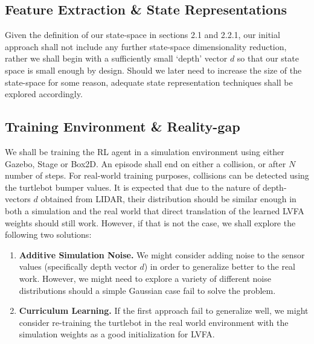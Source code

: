 \documentclass{article}
\begin{document}

\subsection{Feature Extraction \& State Representations}
Given the definition of our state-space in sections 2.1 and 2.2.1, our initial approach shall not include any further state-space dimensionality reduction, rather we shall begin with a sufficiently small `depth' vector $d$ so that our state space is small enough by design. Should we later need to increase the size of the state-space for some reason, adequate state representation techniques shall be explored accordingly.

\subsection{Training Environment \& Reality-gap}
We shall be training the RL agent in a simulation environment using either Gazebo, Stage or Box2D. An episode shall end on either a collision, or after $N$ number of steps. For real-world training purposes, collisions can be detected using the turtlebot bumper values. It is expected that due to the nature of depth-vectors $d$ obtained from LIDAR, their distribution should be similar enough in both a simulation and the real world that direct translation of the learned LVFA weights should still work. However, if that is not the case, we shall explore the following two solutions:
\begin{enumerate}
    \item {\bf Additive Simulation Noise.} We might consider adding noise to the sensor values (specifically depth vector $d$) in order to generalize better to the real work. However, we might need to explore a variety of different noise distributions should a simple Gaussian case fail to solve the problem.
    \item {\bf Curriculum Learning.} If the first approach fail to generalize well, we might consider re-training the turtlebot in the real world environment with the simulation weights as a good initialization for LVFA.
\end{enumerate}
\end{document}
